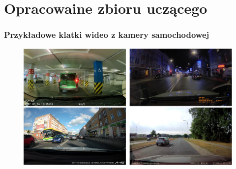 \documentclass{beamer}
\begin{document}
    \section{Opracowaine zbioru uczącego}

    \begin{frame}
        \frametitle{Przykładowe klatki wideo z kamery samochodowej}
        \begin{figure}
            \includegraphics[scale=0.3]{../WIZUT-Dyplom-styl/Pictures/captured_frames}
        \end{figure}
    \end{frame}
\end{document}

